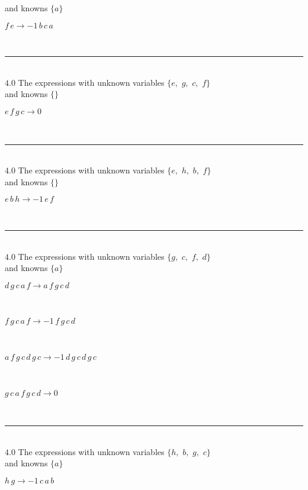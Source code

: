 \documentclass[rep10,leqno]{report}
\begin{document}
and knowns $\{a\}$\smallskip\\
\begin{minipage}{6in}
$
f\,
 e\rightarrow -1\,
 b\,
 c\,
 a
$
\end{minipage}\\
\rule[3pt]{6in}{.7pt}\\
$4.0$  The expressions with unknown variables $\{e,
$ $
g,
$ $
c,
$ $
f\}$\\
and knowns $\{\}$\smallskip\\
\begin{minipage}{6in}
$
e\,
 f\,
 g\,
 c\rightarrow 0
$
\end{minipage}\\
\rule[3pt]{6in}{.7pt}\\
$4.0$  The expressions with unknown variables $\{e,
$ $
h,
$ $
b,
$ $
f\}$\\
and knowns $\{\}$\smallskip\\
\begin{minipage}{6in}
$
e\,
 b\,
 h\rightarrow -1\,
 e\,
 f
$
\end{minipage}\\
\rule[3pt]{6in}{.7pt}\\
$4.0$  The expressions with unknown variables $\{g,
$ $
c,
$ $
f,
$ $
d\}$\\
and knowns $\{a\}$\smallskip\\
\begin{minipage}{6in}
$
d\,
 g\,
 c\,
 a\,
 f\rightarrow a\,
 f\,
 g\,
 c\,
 d
$
\end{minipage}\medskip \\
\begin{minipage}{6in}
$
f\,
 g\,
 c\,
 a\,
 f\rightarrow -1\,
 f\,
 g\,
 c\,
 d
$
\end{minipage}\medskip \\
\begin{minipage}{6in}
$
a\,
 f\,
 g\,
 c\,
 d\,
 g\,
 c\rightarrow -1\,
 d\,
 g\,
 c\,
 d\,
 g\,
 c
$
\end{minipage}\medskip \\
\begin{minipage}{6in}
$
g\,
 c\,
 a\,
 f\,
 g\,
 c\,
 d\rightarrow 0
$
\end{minipage}\\
\rule[3pt]{6in}{.7pt}\\
$4.0$  The expressions with unknown variables $\{h,
$ $
b,
$ $
g,
$ $
c\}$\\
and knowns $\{a\}$\smallskip\\
\begin{minipage}{6in}
$
h\,
 g\rightarrow -1\,
 c\,
 a\,
 b
$
\end{minipage}\\
\end{document}

